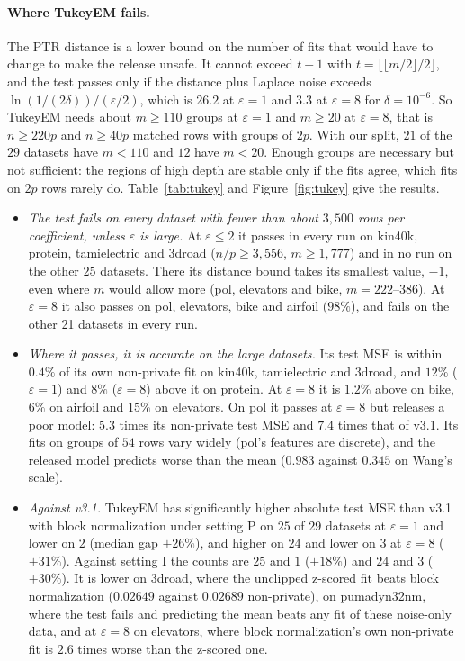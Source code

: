 \paragraph{Where TukeyEM fails.} The PTR distance is a lower bound on the number of fits that would have to change to make the release unsafe. It cannot exceed $t - 1$ with $t = \lfloor\lfloor m/2\rfloor/2\rfloor$, and the test passes only if the distance plus Laplace noise exceeds $\ln(1/(2\delta))/(\varepsilon/2)$, which is $26.2$ at $\varepsilon = 1$ and $3.3$ at $\varepsilon = 8$ for $\delta = 10^{-6}$. So TukeyEM needs about $m \ge 110$ groups at $\varepsilon = 1$ and $m \ge 20$ at $\varepsilon = 8$, that is $n \ge 220p$ and $n \ge 40p$ matched rows with groups of $2p$. With our split, $21$ of the $29$ datasets have $m < 110$ and $12$ have $m < 20$. Enough groups are necessary but not sufficient: the regions of high depth are stable only if the fits agree, which fits on $2p$ rows rarely do. Table~\ref{tab:tukey} and Figure~\ref{fig:tukey} give the results.
\begin{itemize}
  \item \emph{The test fails on every dataset with fewer than about $3{,}500$ rows per coefficient, unless $\varepsilon$ is large.} At $\varepsilon \le 2$ it passes in every run on kin40k, protein, tamielectric and 3droad ($n/p \ge 3{,}556$, $m \ge 1{,}777$) and in no run on the other $25$ datasets. There its distance bound takes its smallest value, $-1$, even where $m$ would allow more (pol, elevators and bike, $m = 222$--$386$). At $\varepsilon = 8$ it also passes on pol, elevators, bike and airfoil ($98\%$), and fails on the other 21 datasets in every run.
  \item \emph{Where it passes, it is accurate on the large datasets.} Its test MSE is within $0.4\%$ of its own non-private fit on kin40k, tamielectric and 3droad, and $12\%$ ($\varepsilon = 1$) and $8\%$ ($\varepsilon = 8$) above it on protein. At $\varepsilon = 8$ it is $1.2\%$ above on bike, $6\%$ on airfoil and $15\%$ on elevators. On pol it passes at $\varepsilon = 8$ but releases a poor model: $5.3$ times its non-private test MSE and $7.4$ times that of v3.1. Its fits on groups of $54$ rows vary widely (pol's features are discrete), and the released model predicts worse than the mean ($0.983$ against $0.345$ on Wang's scale).
  \item \emph{Against v3.1.} TukeyEM has significantly higher absolute test MSE than v3.1 with block normalization under setting P on $25$ of $29$ datasets at $\varepsilon = 1$ and lower on $2$ (median gap $+26\%$), and higher on $24$ and lower on $3$ at $\varepsilon = 8$ ($+31\%$). Against setting I the counts are $25$ and $1$ ($+18\%$) and $24$ and $3$ ($+30\%$). It is lower on 3droad, where the unclipped z-scored fit beats block normalization ($0.02649$ against $0.02689$ non-private), on pumadyn32nm, where the test fails and predicting the mean beats any fit of these noise-only data, and at $\varepsilon = 8$ on elevators, where block normalization's own non-private fit is $2.6$ times worse than the z-scored one.
\end{itemize}
